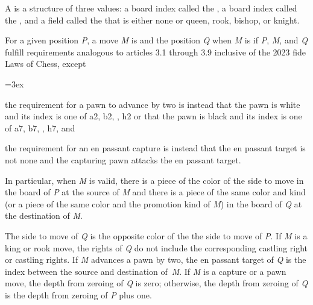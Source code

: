 \minor A  is a structure of three values: a board index called the
, a board index called the , and a field
called the  that is either {\caps none} or queen, rook,
bishop, or knight.

\minor For a given position {\it P}, a move {\it M} is  and the
position {\it Q}  when {\it M} is  if
{\it P}, {\it M}, and {\it Q} fulfill requirements analogous to articles 3.1
through 3.9 inclusive of the 2023 {\caps fide} Laws of Chess, except

{\leftskip=3ex

\parskip the requirement for a pawn to advance by two is instead that
the pawn is white and its index is one of a2, b2, \ellipsis\ot, h2 or that the
pawn is black and its index is one of a7, b7, \ellipsis\ot, h7, and

\parskip the requirement for an en passant capture is instead that
the en passant target is not none and the capturing pawn attacks the en passant
target.

}

In particular, when {\it M} is valid, there is a piece of the color of the side
to move in the board of {\it P} at the source of {\it M} and there is a piece
of the same color and kind (or a piece of the same color and the promotion kind
of {\it M}) in the board of {\it Q} at the destination of {\it M}.

The side to move of {\it Q} is the opposite color of the the side to move of
{\it P}. If {\it M} is a king or rook move, the rights of {\it Q} do not include
the corresponding castling right or castling rights. If {\it M} advances a pawn
by two, the en passant target of {\it Q} is the index between the source and
destination of~{\it M}. If {\it M} is a capture or a pawn move, the depth from
zeroing of {\it Q} is zero; otherwise, the depth from zeroing of {\it Q} is the
depth from zeroing of {\it P} plus one.

\def\rjust#1#2{\hbox to #1{\hfil #2}}
\def\alt{\vrule height 7.125pt depth 1.375pt width 0.7pt}

